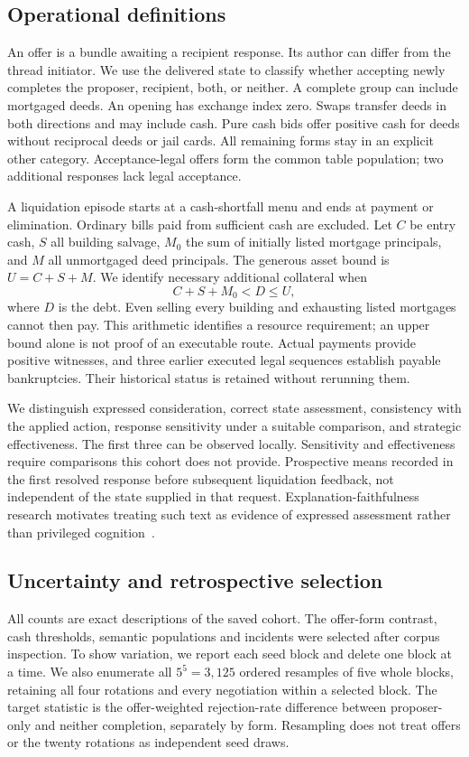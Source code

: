 \subsection{Operational definitions}
An offer is a bundle awaiting a recipient response. Its author can differ from the thread initiator. We use the delivered state to classify whether accepting newly completes the proposer, recipient, both, or neither. A complete group can include mortgaged deeds. An opening has exchange index zero. Swaps transfer deeds in both directions and may include cash. Pure cash bids offer positive cash for deeds without reciprocal deeds or jail cards. All remaining forms stay in an explicit other category. Acceptance-legal offers form the common table population; two additional responses lack legal acceptance.

A liquidation episode starts at a cash-shortfall menu and ends at payment or elimination. Ordinary bills paid from sufficient cash are excluded. Let $C$ be entry cash, $S$ all building salvage, $M_0$ the sum of initially listed mortgage principals, and $M$ all unmortgaged deed principals. The generous asset bound is $U=C+S+M$. We identify necessary additional collateral when
\[
 C+S+M_0<D\leq U,
\]
where $D$ is the debt. Even selling every building and exhausting listed mortgages cannot then pay. This arithmetic identifies a resource requirement; an upper bound alone is not proof of an executable route. Actual payments provide positive witnesses, and three earlier executed legal sequences establish payable bankruptcies. Their historical status is retained without rerunning them.

We distinguish expressed consideration, correct state assessment, consistency with the applied action, response sensitivity under a suitable comparison, and strategic effectiveness. The first three can be observed locally. Sensitivity and effectiveness require comparisons this cohort does not provide. Prospective means recorded in the first resolved response before subsequent liquidation feedback, not independent of the state supplied in that request. Explanation-faithfulness research motivates treating such text as evidence of expressed assessment rather than privileged cognition~\cite{turpin2023unfaithful}.

\subsection{Uncertainty and retrospective selection}
All counts are exact descriptions of the saved cohort. The offer-form contrast, cash thresholds, semantic populations and incidents were selected after corpus inspection. To show variation, we report each seed block and delete one block at a time. We also enumerate all $5^5=3,125$ ordered resamples of five whole blocks, retaining all four rotations and every negotiation within a selected block. The target statistic is the offer-weighted rejection-rate difference between proposer-only and neither completion, separately by form. Resampling does not treat offers or the twenty rotations as independent seed draws.

